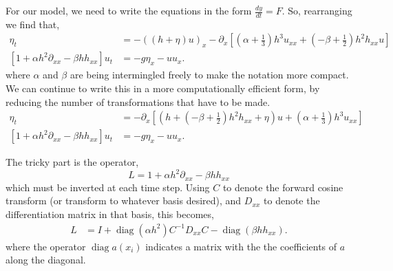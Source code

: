 \documentclass[11pt]{article}
\DeclareMathOperator{\diag}{diag}
\begin{document}
For our model, we need to write the equations in the form $\frac{dy}{dt} = F$. So, rearranging we find that,
\begin{align}
\eta_t  &=-\left( (h+\eta)u\right)_x - \partial_x \left[ \left( \alpha + \frac{1}{3} \right) h^3 u_{xx} + \left(-\beta +\frac{1}{2}\right) h^2h_{xx} u  \right] \\
\left[ 1+ \alpha h^2 \partial_{xx} - \beta h h_{xx} \right]u_t  &= - g \eta_x - u u_x.
\end{align}
where $\alpha$ and $\beta$ are being intermingled freely to make the notation more compact. We can continue to write this in a more computationally efficient form, by reducing the number of transformations that have to be made.
\begin{align}
\eta_t  &=- \partial_x \left[\left(h +  \left(-\beta +\frac{1}{2}\right) h^2h_{xx} +\eta  \right)u +  \left( \alpha + \frac{1}{3} \right) h^3 u_{xx}   \right] \\
\left[ 1+ \alpha h^2 \partial_{xx} - \beta h h_{xx} \right]u_t  &= - g \eta_x - u u_x.
\end{align}

The tricky part is the operator,
\begin{equation}
L = 1+ \alpha h^2 \partial_{xx} - \beta h h_{xx}
\end{equation}
which must be inverted at each time step. Using $C$ to denote the forward cosine transform (or transform to whatever basis desired), and $D_{xx}$ to denote the differentiation matrix in that basis, this becomes,
\begin{align}
L &= I + \diag{ \left( \alpha h^2 \right)} C^{-1} D_{xx} C - \diag{ \left( \beta h h_{xx} \right)}.
\end{align}
where the operator $\diag{a(x_i)}$ indicates a matrix with the the coefficients of $a$ along the diagonal.
\end{document}
